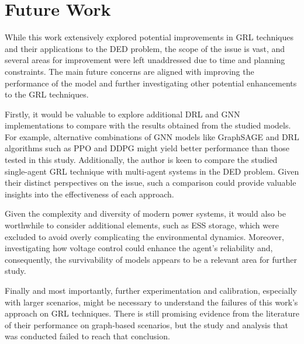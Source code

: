 \section{Future Work}

While this work extensively explored potential improvements in \ac{GRL} techniques and their applications to the \ac{DED} problem, the scope of the issue is vast, and several areas for improvement were left unaddressed due to time and planning constraints. The main future concerns are aligned with improving the performance of the model and further investigating other potential enhancements to the \ac{GRL} techniques. \par

Firstly, it would be valuable to explore additional \ac{DRL} and \ac{GNN} implementations to compare with the results obtained from the studied models. For example, alternative combinations of \ac{GNN} models like GraphSAGE and \ac{DRL} algorithms such as PPO and DDPG might yield better performance than those tested in this study. Additionally, the author is keen to compare the studied single-agent \ac{GRL} technique with multi-agent systems in the \ac{DED} problem. Given their distinct perspectives on the issue, such a comparison could provide valuable insights into the effectiveness of each approach. \par

Given the complexity and diversity of modern power systems, it would also be worthwhile to consider additional elements, such as \acf{ESS} storage, which were excluded to avoid overly complicating the environmental dynamics. Moreover, investigating how voltage control could enhance the agent's reliability and, consequently, the survivability of models appears to be a relevant area for further study. \par

Finally and most importantly, further experimentation and calibration, especially with larger scenarios, might be necessary to understand the failures of this work's approach on \ac{GRL} techniques. There is still promising evidence from the literature of their performance on graph-based scenarios, but the study and analysis that was conducted failed to reach that conclusion. 


